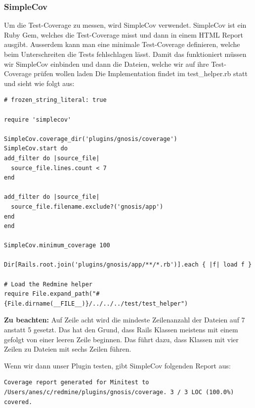 \subsubsection{SimpleCov}
Um die Test-Coverage zu messen, wird SimpleCov verwendet. SimpleCov ist ein Ruby Gem, welches die Test-Coverage misst und
dann in einem HTML Report ausgibt. Ausserdem kann man eine minimale Test-Coverage definieren, welche beim Unterschreiten
die Tests fehlschlagen lässt. Damit das funktioniert müssen wir SimpleCov einbinden und dann die Dateien, welche wir
auf ihre Test-Coverage prüfen wollen laden\newline
Die Implementation findet im test\_helper.rb statt und sieht wie folgt aus:
\begin{codebox}[]
  \begin{verbatim}
# frozen_string_literal: true

require 'simplecov'

SimpleCov.coverage_dir('plugins/gnosis/coverage')
SimpleCov.start do
add_filter do |source_file|
  source_file.lines.count < 7
end

add_filter do |source_file|
  source_file.filename.exclude?('gnosis/app')
end
end

SimpleCov.minimum_coverage 100

Dir[Rails.root.join('plugins/gnosis/app/**/*.rb')].each { |f| load f }

# Load the Redmine helper
require File.expand_path("#{File.dirname(__FILE__)}/../../../test/test_helper")
  \end{verbatim}
\end{codebox}
\textbf{Zu beachten:} Auf Zeile acht wird die mindeste Zeilenanzahl der Dateien auf 7 anstatt 5 gesetzt. Das hat den
Grund, dass Rails Klassen meistens mit einem  gefolgt von einer
leeren Zeile beginnen. Das führt dazu, dass Klassen mit vier Zeilen zu Dateien mit sechs Zeilen führen. \newline

Wenn wir dann unser Plugin testen, gibt SimpleCov folgenden Report aus:
\begin{codebox}
  \begin{verbatim}
Coverage report generated for Minitest to /Users/anes/c/redmine/plugins/gnosis/coverage. 3 / 3 LOC (100.0%) covered.
  \end{verbatim}
\end{codebox}

